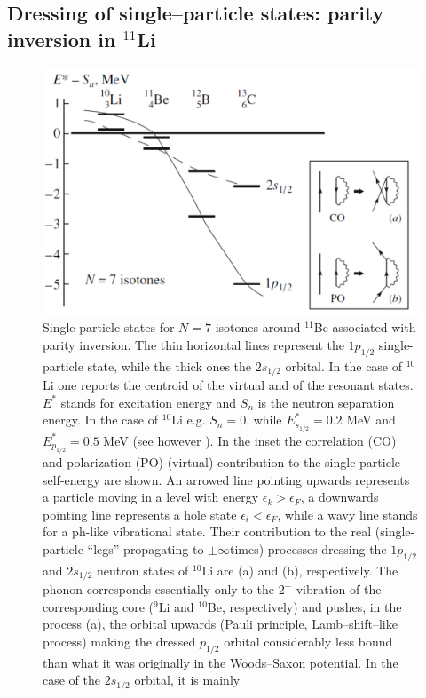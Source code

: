 \subsection{Dressing of single--particle states: parity inversion in $^{11}$Li}\label{C6S2.2x}
 \begin{figure}[h!]
 \centerline{\includegraphics*[width=12 cm,angle=0]{C6/figs_C6/fig6_2_4.pdf}}
\caption{Single-particle states for $N = 7$ isotones around $^{11}$Be associated with parity inversion. The thin horizontal lines
represent the $1p_{1/2}$ single-particle state, while the thick ones the $2s_{1/2}$ orbital. In the case of $^{10}$Li one reports the centroid of
the virtual and of the resonant states. $E^*$ stands for excitation energy and $S_n$ is the neutron separation energy. In the case
of $^{10}$Li e.g. $S_n = 0$, while $E^*_{s_{1/2}} = 0.2$ MeV and $E^*_{p_{1/2}} = 0.5$ MeV (see however \cite{Cavallaro:17}). In the inset the correlation (CO) and polarization (PO)
(virtual) contribution to the single-particle self-energy are shown. An arrowed line pointing upwards represents a particle
moving in a level with energy $\epsilon_k > \epsilon_F$, a downwards pointing line represents a hole state $\epsilon_i < \epsilon_F$, while a wavy line stands for
a ph-like vibrational state. Their contribution to the real (single-particle ``legs'' propagating to $\pm\infty$times) processes dressing
the $1p_{1/2}$ and $2s_{1/2}$ neutron states of $^{10}$Li  are (a) and (b), respectively.  The phonon corresponds
essentially only to the $2^+$ vibration of the corresponding core ($^9$Li and $^{10}$Be, respectively) and pushes, in the process (a), the orbital upwards
(Pauli principle, Lamb--shift--like process) making the dressed $p_{1/2}$ orbital considerably less bound than what it was originally
in the Woods--Saxon potential. In the case of the $2s_{1/2}$ orbital, it is mainly
}
\end{figure}
